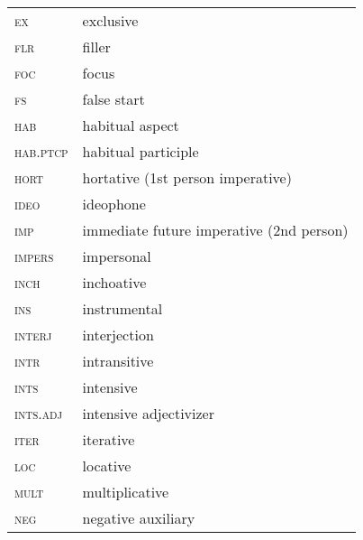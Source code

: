 \documentclass[output=paper]{langscibook}
\begin{document}
\begin{tabularx}{.45\textwidth}{lQ}
\textsc{ex} & exclusive\\
\textsc{flr} & filler\\
\textsc{foc} & focus\\
\textsc{fs} & false start\\
\textsc{hab} & habitual aspect\\
\textsc{hab.ptcp} & habitual participle\\
\textsc{hort} & hortative (1st person imperative)\\
\textsc{ideo} & ideophone\\
\textsc{imp} & immediate future imperative (2nd person)\\
\textsc{impers} & impersonal\\
\textsc{inch} & inchoative \\
\textsc{ins} & instrumental\\
\textsc{interj} & interjection\\
\textsc{intr} & intransitive\\
\textsc{ints} & intensive\\
\textsc{ints.adj} & intensive adjectivizer\\
\textsc{iter} & iterative\\
\textsc{loc} & locative\\
\textsc{mult} & multiplicative\\
\textsc{neg} & negative auxiliary\\
\end{tabularx}
\end{document}
